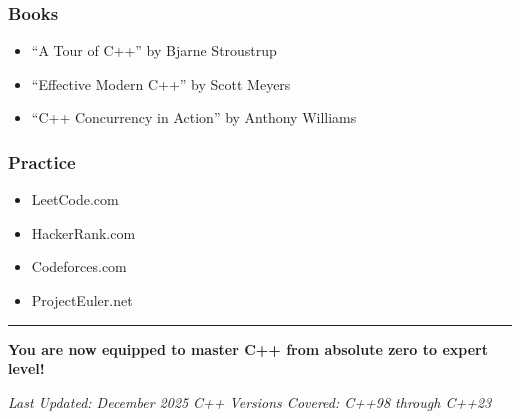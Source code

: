 \hypertarget{books}{%
\subsubsection{Books}\label{books}}

\begin{itemize}
\tightlist
\item
  ``A Tour of C++'' by Bjarne Stroustrup
\item
  ``Effective Modern C++'' by Scott Meyers
\item
  ``C++ Concurrency in Action'' by Anthony Williams
\end{itemize}

\hypertarget{practice}{%
\subsubsection{Practice}\label{practice}}

\begin{itemize}
\tightlist
\item
  LeetCode.com
\item
  HackerRank.com
\item
  Codeforces.com
\item
  ProjectEuler.net
\end{itemize}

\begin{center}\rule{0.5\linewidth}{0.5pt}\end{center}

\textbf{You are now equipped to master C++ from absolute zero to expert
level!}

\emph{Last Updated: December 2025} \emph{C++ Versions Covered: C++98
through C++23}
